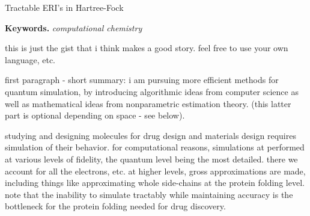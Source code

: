 \documentclass[twoside,leqno, 12pt]{article}
\date{}
\begin{document}
\begin{center}
\LARGE{Tractable ERI's in Hartree-Fock} \newline
\end{center}
\vspace{-0.5in}
\textbf{Keywords.}  \textit{computational chemistry}




this is just the gist that i think makes a good story.  feel free to
use your own language, etc.

first paragraph - short summary:  i am pursuing more efficient methods for quantum 
simulation, by introducing algorithmic ideas from computer science
as well as mathematical ideas from nonparametric estimation theory. 
(this latter part is optional depending on space - see below). 

studying and designing molecules for drug design and materials design
requires simulation of their behavior.  for computational reasons,
simulations at performed at various levels of fidelity, the quantum
level being the most detailed.  there we account for all the 
electrons, etc.  at higher levels, gross approximations are made,
including things like approximating whole side-chains at the protein
folding level.  note that the inability to simulate tractably while
maintaining accuracy is the bottleneck for the protein folding needed 
for drug discovery.
\end{document}
